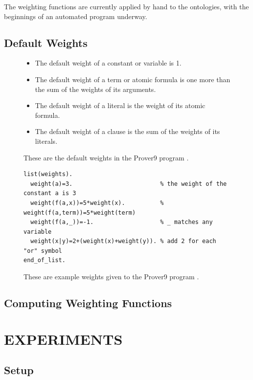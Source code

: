 \documentclass{article}
\begin{document}
The weighting functions are currently applied by hand to the ontologies, with the beginnings of an automated program underway. 



\subsection{{Default Weights}}
\begin{figure}[h]
\centering
\begin{itemize}
    \item The default weight of a constant or variable is 1.
    \item The default weight of a term or atomic formula is one more than the sum of the weights of its arguments.
    \item The default weight of a literal is the weight of its atomic formula.
    \item The default weight of a clause is the sum of the weights of its literals.
\end{itemize}
\caption{These are the default weights in the Prover9 program \cite{mccune2005prover9}.}
\label{fig:default_weights}
\end{figure}

\begin{figure}[h]
\centering
\begin{verbatim}
list(weights).
  weight(a)=3.                         % the weight of the constant a is 3
  weight(f(a,x))=5*weight(x).          % weight(f(a,term))=5*weight(term)
  weight(f(a,_))=-1.                   % _ matches any variable
  weight(x|y)=2+(weight(x)+weight(y)). % add 2 for each "or" symbol
end_of_list.
\end{verbatim}
\caption{These are example weights given to the Prover9 program \cite{mccune2005prover9}.}
\label{fig:example_weights}
\end{figure}

\subsection{Computing Weighting Functions}

\newpage
\vspace*{.05in}
\section{\MakeUppercase{Experiments}}

\subsection{{Setup}}
\end{document}

